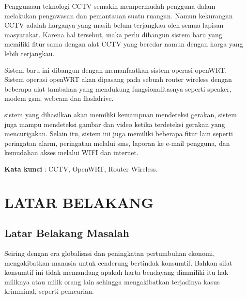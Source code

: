 \documentclass{jtetiproposalskripsi}
\begin{document}
\cover

\approvalpage


\begin{abstractind}
Penggunaan teknologi CCTV semakin mempermudah pengguna dalam melakukan pengawasan dan pemantauan suatu ruangan. Namun kekurangan CCTV adalah harganya yang masih belum terjangkau oleh semua lapisan masyarakat. Karena hal tersebut, maka perlu dibangun sistem baru yang memiliki fitur sama dengan alat CCTV yang beredar namun dengan harga yang lebih terjangkau. 

Sistem baru ini dibangun dengan memanfaatkan sistem operasi openWRT. Sistem operasi openWRT akan dipasang pada sebuah router wireless dengan beberapa alat tambahan yang mendukung fungsionalitasnya seperti speaker, modem gsm, webcam dan flashdrive.

sistem yang dihasilkan akan memiliki kemampuan mendeteksi gerakan, sistem juga mampu mendeteksi gambar dan video ketika terdeteksi gerakan yang mencurigakan. Selain itu, sistem ini juga memiliki beberapa fitur lain seperti peringatan alarm, peringatan melalui sms, laporan ke e-mail pengguna, dan kemudahan akses melalui WIFI dan internet.


\bigskip
\textbf{Kata kunci} : CCTV, OpenWRT, Router Wireless.
\end{abstractind}

\tableofcontents
{}
\clearpage{}\setcounter{page}{1}

\chapter{LATAR BELAKANG}

\section{Latar Belakang Masalah}
Seiring dengan era globalisasi dan peningkatan pertumbuhan ekonomi, mengakibatkan manusia untuk cenderung bertindak konsumtif. Bahkan sifat konsumtif ini tidak memandang apakah harta bendayang dimmiliki itu hak miliknya atau milik orang lain sehingga mengakibatkan terjadinya kasus krimminal, seperti pemcurian.
\end{document}
